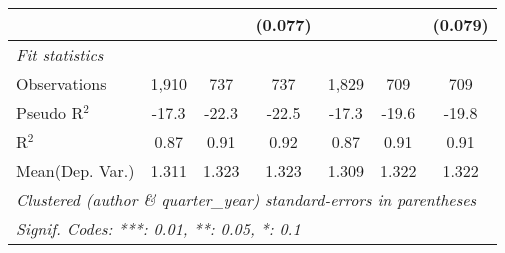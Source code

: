 \begin{tabular}{lcccccc}
                           &         &         & (0.077)      &         &              & (0.079)\\   
   \midrule
   \emph{Fit statistics}\\
   Observations            & 1,910   & 737     & 737          & 1,829   & 709          & 709\\  
   Pseudo R$^2$            & -17.3   & -22.3   & -22.5        & -17.3   & -19.6        & -19.8\\  
   R$^2$                   & 0.87    & 0.91    & 0.92         & 0.87    & 0.91         & 0.91\\  
Mean(Dep. Var.) & 1.311 & 1.323 & 1.323 & 1.309 & 1.322 & 1.322 \\
   \midrule \midrule
   \multicolumn{7}{l}{\emph{Clustered (author \& quarter\_year) standard-errors in parentheses}}\\
   \multicolumn{7}{l}{\emph{Signif. Codes: ***: 0.01, **: 0.05, *: 0.1}}\\
\end{tabular}
\par\endgroup
